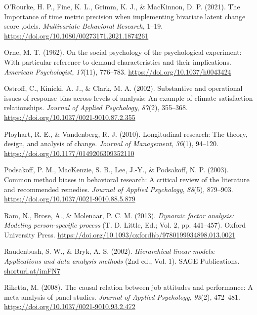 \documentclass[
  english,
  man,floatsintext]{apa7}
\newlength{\cslhangindent}
\newlength{\cslentryspacingunit} %
\newenvironment{CSLReferences}[2] %
 {%
  \setlength{\parindent}{0pt}
  \ifodd #1
  \let\oldpar\par
  \def\par{\hangindent=\cslhangindent\oldpar}
  \fi
  \setlength{\parskip}{#2\cslentryspacingunit}
 }%
 {}
\begin{document}
\begin{CSLReferences}{1}{0}
\leavevmode{}%
O'Rourke, H. P., Fine, K. L., Grimm, K. J., \& MacKinnon, D. P. (2021). The Importance of time metric precision when implementing bivariate latent change score ,odels. \emph{Multivariate Behavioral Research}, 1--19. \url{https://doi.org/10.1080/00273171.2021.1874261}

\leavevmode{}%
Orne, M. T. (1962). On the social psychology of the psychological experiment: With particular reference to demand characteristics and their implications. \emph{American Psychologist}, \emph{17}(11), 776--783. \url{https://doi.org/10.1037/h0043424}

\leavevmode{}%
Ostroff, C., Kinicki, A. J., \& Clark, M. A. (2002). Substantive and operational issues of response bias across levels of analysis: An example of climate-satisfaction relationships. \emph{Journal of Applied Psychology}, \emph{87}(2), 355--368. \url{https://doi.org/10.1037/0021-9010.87.2.355}

\leavevmode{}%
Ployhart, R. E., \& Vandenberg, R. J. (2010). Longitudinal research: The theory, design, and analysis of change. \emph{Journal of Management}, \emph{36}(1), 94--120. \url{https://doi.org/10.1177/0149206309352110}

\leavevmode{}%
Podsakoff, P. M., MacKenzie, S. B., Lee, J.-Y., \& Podsakoff, N. P. (2003). Common method biases in behavioral research: A critical review of the literature and recommended remedies. \emph{Journal of Applied Psychology}, \emph{88}(5), 879--903. \url{https://doi.org/10.1037/0021-9010.88.5.879}

\leavevmode{}%
Ram, N., Brose, A., \& Molenaar, P. C. M. (2013). \emph{Dynamic factor analysis: Modeling person-specific process} (T. D. Little, Ed.; Vol. 2, pp. 441--457). Oxford University Press. \url{https://doi.org/10.1093/oxfordhb/9780199934898.013.0021}

\leavevmode{}%
Raudenbush, S. W., \& Bryk, A. S. (2002). \emph{Hierarchical linear models: Applications and data analysis methods} (2nd ed., Vol. 1). SAGE Publications. \href{https://shorturl.at/imFN7}{shorturl.at/imFN7}

\leavevmode{}%
Riketta, M. (2008). The causal relation between job attitudes and performance: A meta-analysis of panel studies. \emph{Journal of Applied Psychology}, \emph{93}(2), 472--481. \url{https://doi.org/10.1037/0021-9010.93.2.472}


\end{CSLReferences}
\end{document}
